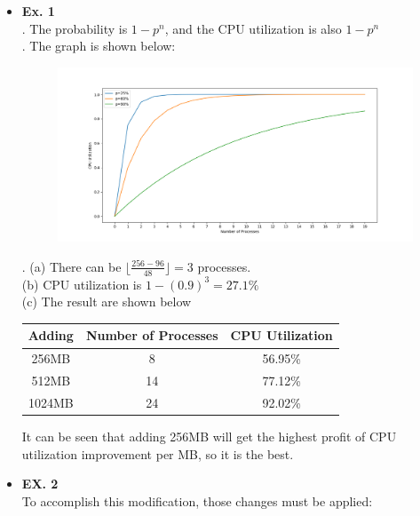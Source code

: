 \documentclass{article}
\begin{document}
\begin{itemize}
\item {\bf Ex. 1}\\
{. The probability is $1-p^n$}, and the CPU utilization is also $1-p^n$\\

{. The graph is shown below:}

\begin{figure}[h]
    \centering
    \includegraphics[scale=0.3]{1.png}
\end{figure}

{. (a) There can be $\lfloor \frac{256-96}{48} \rfloor =3$ processes.}\\

{\noindent (b) CPU utilization is $1-(0.9)^3=27.1\%$}\\

{\noindent (c) The result are shown below}

\begin{table}[h]
    \centering
    \begin{tabular}{|c|c|c|}
    \hline
    Adding & Number of Processes & CPU Utilization \\ \hline
    256MB  & 8                   & 56.95\%         \\ \hline
    512MB  & 14                  & 77.12\%         \\ \hline
    1024MB & 24                  & 92.02\%         \\ \hline
    \end{tabular}
\end{table}

It can be seen that adding 256MB will get the highest profit of CPU utilization improvement per MB, so it is the best.\\
\item {\bf EX. 2}\\
To accomplish this modification, those changes must be applied:\\


\end{itemize}
\end{document}
